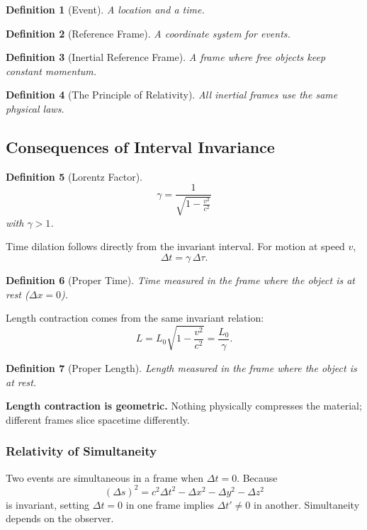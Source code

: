 \documentclass{article}
\newtheorem{definition}{Definition}
\begin{document}
\begin{definition}[Event]
A location and a time.
\end{definition}

\begin{definition}[Reference Frame]
A coordinate system for events.
\end{definition}

\begin{definition}[Inertial Reference Frame]
A frame where free objects keep constant momentum.
\end{definition}

\begin{definition}[The Principle of Relativity]
All inertial frames use the same physical laws.
\end{definition}

\subsection{Consequences of Interval Invariance}

\begin{definition}[Lorentz Factor]
\[
\gamma = \frac{1}{\sqrt{1 - \frac{v^2}{c^2}}}
\]
with \(\gamma > 1\).
\end{definition}

Time dilation follows directly from the invariant interval. For motion at speed \(v\),
\[
\Delta t = \gamma\,\Delta\tau.
\]

\begin{definition}[Proper Time]
Time measured in the frame where the object is at rest (\(\Delta x = 0\)).
\end{definition}

Length contraction comes from the same invariant relation:
\[
L = L_0\sqrt{1 - \frac{v^2}{c^2}} = \frac{L_0}{\gamma}.
\]

\begin{definition}[Proper Length]
Length measured in the frame where the object is at rest.
\end{definition}

\textbf{Length contraction is geometric.} Nothing physically compresses the material; different frames slice spacetime differently.

\subsubsection{Relativity of Simultaneity}

Two events are simultaneous in a frame when \(\Delta t = 0\). Because
\[
(\Delta s)^2 = c^2\Delta t^2 - \Delta x^2 - \Delta y^2 - \Delta z^2
\]
is invariant, setting \(\Delta t = 0\) in one frame implies \(\Delta t' \ne 0\) in another. Simultaneity depends on the observer.
\end{document}
